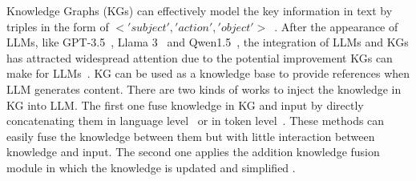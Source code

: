 Knowledge Graphs (KGs) can effectively model the key information in text by triples in the form of $<'subject', 'action', 'object'>$~\citep{KGSurvey}. After the appearance of LLMs, like GPT-3.5~\cite{achiam2023gpt}, Llama 3~\cite{llama3} and Qwen1.5~\cite{bai2023qwen}, the integration of LLMs and KGs has attracted widespread attention due to the potential improvement KGs can make for LLMs~\cite{KGForLLMSurvey}. KG can be used as a knowledge base to provide references when LLM generates content. 
There are two kinds of works to inject the knowledge in KG into LLM. The first one fuse knowledge in KG and input by directly concatenating them in language level~\cite{KGForQA,wen2023mindmap,sun2021ernie} or in token level~\cite{zhang2019ernie,he2019integrating,su2021cokebert}. These methods can easily fuse the knowledge between them but with little interaction between knowledge and input. The second one applies the addition knowledge fusion module in which the knowledge is updated and simplified \cite{sun2021jointlk,zhang2022greaselm}.


